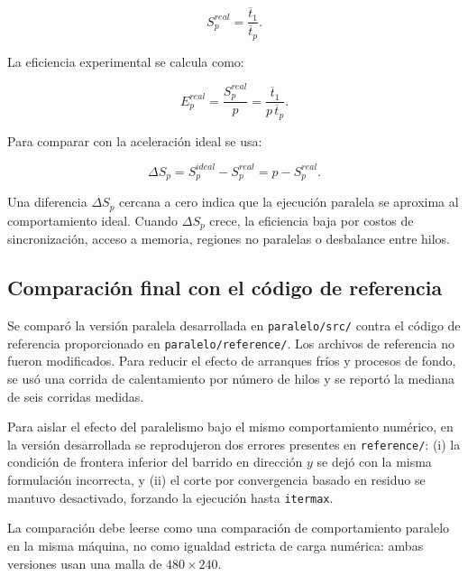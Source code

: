 \documentclass[11pt,a4paper]{article}
\begin{document}
\begin{equation}
S_p^{real}=\frac{\overline{t}_1}{\overline{t}_p}.
\end{equation}

La eficiencia experimental se calcula como:

\begin{equation}
E_p^{real}=\frac{S_p^{real}}{p}
=\frac{\overline{t}_1}{p\,\overline{t}_p}.
\end{equation}

Para comparar con la aceleraci\'on ideal se usa:

\begin{equation}
\Delta S_p = S_p^{ideal}-S_p^{real}=p-S_p^{real}.
\end{equation}

Una diferencia $\Delta S_p$ cercana a cero indica que la ejecuci\'on paralela se
aproxima al comportamiento ideal. Cuando $\Delta S_p$ crece, la eficiencia baja
por costos de sincronizaci\'on, acceso a memoria, regiones no paralelas o
desbalance entre hilos.

\subsection{Comparaci\'on final con el c\'odigo de referencia}

Se compar\'o la versi\'on paralela desarrollada en \texttt{paralelo/src/} contra
el c\'odigo de referencia proporcionado en \texttt{paralelo/reference/}. Los
archivos de referencia no fueron modificados. Para reducir el efecto de
arranques fr\'ios y procesos de fondo, se us\'o una corrida de calentamiento por
n\'umero de hilos y se report\'o la mediana de seis corridas medidas.

Para aislar el efecto del paralelismo bajo el mismo comportamiento num\'erico,
en la versi\'on desarrollada se reprodujeron dos errores presentes en
\texttt{reference/}: (i) la condici\'on de frontera inferior del barrido en
direcci\'on $y$ se dej\'o con la misma formulaci\'on incorrecta, y (ii) el corte
por convergencia basado en residuo se mantuvo desactivado, forzando la
ejecuci\'on hasta \texttt{itermax}.

La comparaci\'on debe leerse como una comparaci\'on de comportamiento paralelo en
la misma m\'aquina, no como igualdad estricta de carga num\'erica: ambas versiones 
usan una malla de $480\times 240$.
\end{document}
